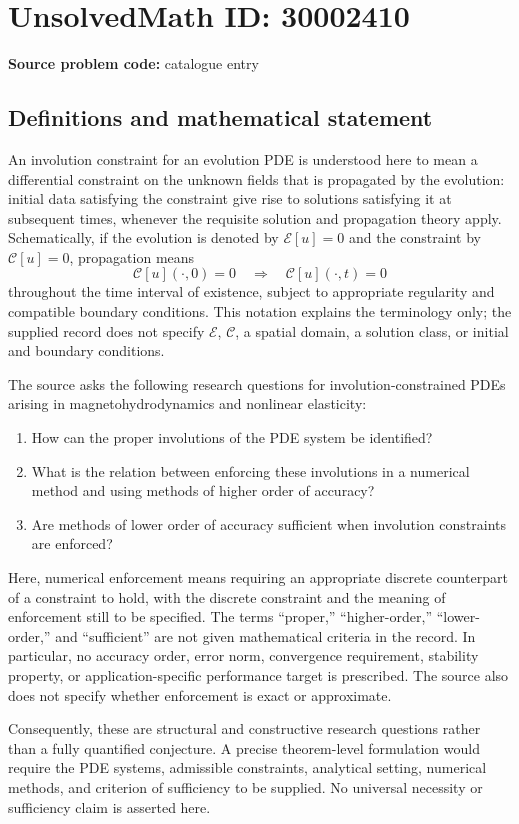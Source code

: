 \documentclass[11pt]{article}
\begin{document}
\section*{UnsolvedMath ID: 30002410}
\textbf{Source problem code:} catalogue entry
\subsection{Definitions and mathematical statement}
An involution constraint for an evolution PDE is understood here to mean a differential constraint on the unknown fields that is propagated by the evolution: initial data satisfying the constraint give rise to solutions satisfying it at subsequent times, whenever the requisite solution and propagation theory apply. Schematically, if the evolution is denoted by \(\mathcal E[u]=0\) and the constraint by \(\mathcal C[u]=0\), propagation means
\[
\mathcal C[u](\cdot,0)=0
\quad\Longrightarrow\quad
\mathcal C[u](\cdot,t)=0
\]
throughout the time interval of existence, subject to appropriate regularity and compatible boundary conditions. This notation explains the terminology only; the supplied record does not specify \(\mathcal E\), \(\mathcal C\), a spatial domain, a solution class, or initial and boundary conditions.

The source asks the following research questions for involution-constrained PDEs arising in magnetohydrodynamics and nonlinear elasticity:
\begin{enumerate}
\item How can the proper involutions of the PDE system be identified?
\item What is the relation between enforcing these involutions in a numerical method and using methods of higher order of accuracy?
\item Are methods of lower order of accuracy sufficient when involution constraints are enforced?
\end{enumerate}
Here, numerical enforcement means requiring an appropriate discrete counterpart of a constraint to hold, with the discrete constraint and the meaning of enforcement still to be specified. The terms ``proper,'' ``higher-order,'' ``lower-order,'' and ``sufficient'' are not given mathematical criteria in the record. In particular, no accuracy order, error norm, convergence requirement, stability property, or application-specific performance target is prescribed. The source also does not specify whether enforcement is exact or approximate.

Consequently, these are structural and constructive research questions rather than a fully quantified conjecture. A precise theorem-level formulation would require the PDE systems, admissible constraints, analytical setting, numerical methods, and criterion of sufficiency to be supplied. No universal necessity or sufficiency claim is asserted here.
\end{document}
